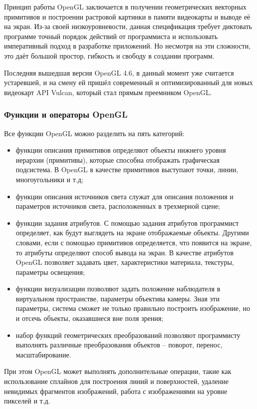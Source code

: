 Принцип работы  OpenGL заключается в получении геометрических векторных примитивов и построении растровой картинки в памяти видеокарты и выводе её на экран. Из-за своей низкоуровневости, данная спецификация требует диктовать программе точный порядок действий от программиста и использовать императивный подход в разработке приложений. Но несмотря на эти сложности, это даёт большой простор, гибкость и свободу в создании программ.

Последняя вышедшая версия OpenGL 4.6, в данный момент уже считается устаревшей, и на смену ей пришёл современный и оптимизированный для новых видеокарт API Vulcan, который стал прямым преемником OpenGL.

\subsubsection{Функции и операторы OpenGL}
Все функции OpenGL можно разделить на пять категорий:
\begin{itemize}
	\item функции описания примитивов определяют объекты нижнего уровня иерархии (примитивы), которые способна отображать графическая подсистема. В OpenGL в качестве примитивов выступают точки, линии, многоугольники и т.д;
	\item функции описания источников света служат для описания положения и параметров источников света, расположенных в трехмерной сцене;
	\item функции задания атрибутов. С помощью задания атрибутов программист определяет, как будут выглядеть на экране отображаемые объекты. Другими словами, если с помощью примитивов определяется, что появится на экране, то атрибуты определяют способ вывода на экран. В качестве атрибутов OpenGL позволяет задавать цвет, характеристики материала, текстуры, параметры освещения;
	\item функции визуализации позволяют задать положение наблюдателя в виртуальном пространстве, параметры объектива камеры. Зная эти параметры, система сможет не только правильно построить изображение, но и отсечь объекты, оказавшиеся вне поля зрения;
	\item набор функций геометрических преобразований позволяют программисту выполнять различные преобразования объектов – поворот, перенос, масштабирование.
\end{itemize}

При этом OpenGL может выполнять дополнительные операции, такие как использование сплайнов для построения линий и поверхностей, удаление невидимых фрагментов изображений, работа с изображениями на уровне пикселей и т.д.

